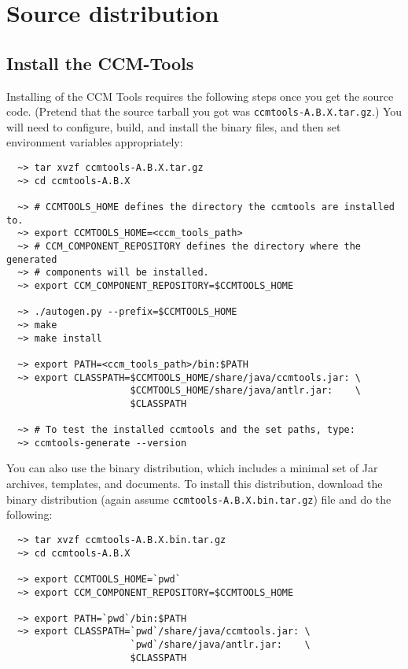 \section{Source distribution}

\subsection{Install the CCM-Tools}
Installing of the CCM Tools requires the following steps once you get the source
code. (Pretend that the source tarball you got was {\tt ccmtools-A.B.X.tar.gz}.)
You will need to configure, build, and install the binary files, and then set
environment variables appropriately:
\begin{small}
\begin{verbatim}
  ~> tar xvzf ccmtools-A.B.X.tar.gz
  ~> cd ccmtools-A.B.X

  ~> # CCMTOOLS_HOME defines the directory the ccmtools are installed to.
  ~> export CCMTOOLS_HOME=<ccm_tools_path>
  ~> # CCM_COMPONENT_REPOSITORY defines the directory where the generated
  ~> # components will be installed.
  ~> export CCM_COMPONENT_REPOSITORY=$CCMTOOLS_HOME

  ~> ./autogen.py --prefix=$CCMTOOLS_HOME
  ~> make
  ~> make install

  ~> export PATH=<ccm_tools_path>/bin:$PATH
  ~> export CLASSPATH=$CCMTOOLS_HOME/share/java/ccmtools.jar: \
                      $CCMTOOLS_HOME/share/java/antlr.jar:    \
                      $CLASSPATH

  ~> # To test the installed ccmtools and the set paths, type:
  ~> ccmtools-generate --version
\end{verbatim}
\end{small}



You can also use the binary distribution, which includes a minimal set of Jar
archives, templates, and documents. To install this distribution, download the
binary distribution (again assume {\tt ccmtools-A.B.X.bin.tar.gz}) file and do
the following:
\begin{small}
\begin{verbatim}
  ~> tar xvzf ccmtools-A.B.X.bin.tar.gz
  ~> cd ccmtools-A.B.X

  ~> export CCMTOOLS_HOME=`pwd`
  ~> export CCM_COMPONENT_REPOSITORY=$CCMTOOLS_HOME

  ~> export PATH=`pwd`/bin:$PATH
  ~> export CLASSPATH=`pwd`/share/java/ccmtools.jar: \
                      `pwd`/share/java/antlr.jar:    \
                      $CLASSPATH
\end{verbatim}
\end{small}

